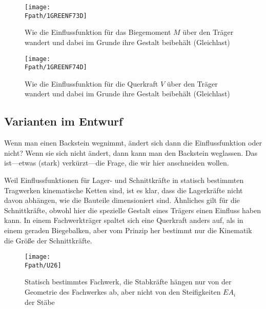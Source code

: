 {{{%
\begin{figure}[tbp]
\centering
\texttt{[image: \\Fpath/1GREENF73D]}
\caption{Wie die Einflussfunktion f\"{u}r das Biegemoment $M$ \"{u}ber den Tr\"{a}ger wandert und  dabei im Grunde ihre Gestalt beibeh\"{a}lt (Gleichlast)}
\label{1GreenF73}%
%
\end{figure}%

\begin{figure}[tbp]
\centering
\texttt{[image: \\Fpath/1GREENF74D]}
\caption{Wie die Einflussfunktion f\"{u}r die Querkraft $V$ \"{u}ber den Tr\"{a}ger wandert und dabei im Grunde ihre Gestalt beibeh\"{a}lt (Gleichlast) }
\label{1GreenF74}%
%
\end{figure}%

{\textcolor{blau2}{\section{Varianten im Entwurf}}}
Wenn man einen Backstein wegnimmt, \"{a}ndert sich dann die Einflussfunktion oder nicht? Wenn sie sich nicht \"{a}ndert, dann kann man den Backstein weglassen. Das ist---etwas (stark) verk\"{u}rzt---die Frage, die wir hier anschneiden wollen.

Weil Einflussfunktionen f\"{u}r Lager- und Schnittkr\"{a}fte in statisch bestimmten Tragwerken kinematische Ketten sind, ist es klar, dass die Lagerkr\"{a}fte nicht davon abh\"{a}ngen, wie die Bauteile dimensioniert sind. \"{A}hnliches gilt f\"{u}r die Schnittkr\"{a}fte, obwohl hier die spezielle Gestalt eines Tr\"{a}gers einen Einfluss haben kann. In einem Fachwerktr\"{a}ger spaltet sich eine Querkraft anders auf, als in einem geraden Biegebalken, aber vom Prinzip her
bestimmt nur die Kinematik die Gr\"{o}{\ss}e der Schnittkr\"{a}fte.
\begin{figure}
\centering
\texttt{[image: \\Fpath/U26]}
\caption{Statisch bestimmtes Fachwerk, die Stabkr\"{a}fte h\"{a}ngen nur von der Geometrie des Fachwerkes ab, aber nicht von den Steifigkeiten $EA_i$ der St\"{a}be}
\label{U26}%
%
\end{figure}%

}}}
